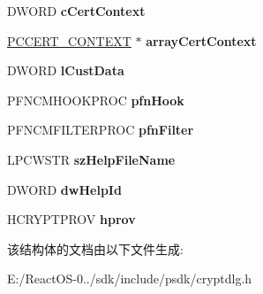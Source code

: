 \begin{DoxyCompactItemize}
\item 
\mbox{\label{structtag_c_s_s_w_a176cf61a485d7660675d7a39fa23d4af}} 
D\+W\+O\+RD {\bfseries c\+Cert\+Context}
\item 
\mbox{\label{structtag_c_s_s_w_a0703e1574bea756f130c97159cae68f0}} 
\hyperlink{struct___c_e_r_t___c_o_n_t_e_x_t}{P\+C\+C\+E\+R\+T\+\_\+\+C\+O\+N\+T\+E\+XT} $\ast$ {\bfseries array\+Cert\+Context}
\item 
\mbox{\label{structtag_c_s_s_w_a86f84c59809fdfeb51c06d06adec4fa8}} 
D\+W\+O\+RD {\bfseries l\+Cust\+Data}
\item 
\mbox{\label{structtag_c_s_s_w_aebfd86acf37bbd5cacbc02fef73c70e7}} 
P\+F\+N\+C\+M\+H\+O\+O\+K\+P\+R\+OC {\bfseries pfn\+Hook}
\item 
\mbox{\label{structtag_c_s_s_w_af7f14c3cb5cfeebcd10adc013243d7a4}} 
P\+F\+N\+C\+M\+F\+I\+L\+T\+E\+R\+P\+R\+OC {\bfseries pfn\+Filter}
\item 
\mbox{\label{structtag_c_s_s_w_a0b61542c242b6abc34db754e591149e3}} 
L\+P\+C\+W\+S\+TR {\bfseries sz\+Help\+File\+Name}
\item 
\mbox{\label{structtag_c_s_s_w_a716591247ce6589a9d63167ba64c1af6}} 
D\+W\+O\+RD {\bfseries dw\+Help\+Id}
\item 
\mbox{\label{structtag_c_s_s_w_aa38d8da4ffb15ea74af9360a715e067c}} 
H\+C\+R\+Y\+P\+T\+P\+R\+OV {\bfseries hprov}
\end{DoxyCompactItemize}


该结构体的文档由以下文件生成\+:\begin{DoxyCompactItemize}
\item 
E\+:/\+React\+O\+S-\/0../sdk/include/psdk/cryptdlg.\+h\end{DoxyCompactItemize}
